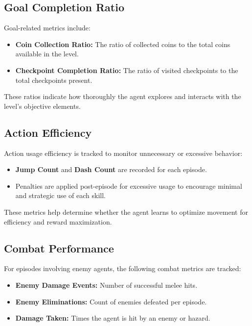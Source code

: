 \documentclass[12pt,oneside,openright,a4paper]{cpe-english-project}
\begin{document}
\subsection{Goal Completion Ratio}
Goal-related metrics include:

\begin{itemize}
\item \textbf{Coin Collection Ratio:} The ratio of collected coins to the total coins available in the level.
\item \textbf{Checkpoint Completion Ratio:} The ratio of visited checkpoints to the total checkpoints present.
\end{itemize}

These ratios indicate how thoroughly the agent explores and interacts with the level’s objective elements.

\subsection{Action Efficiency}
Action usage efficiency is tracked to monitor unnecessary or excessive behavior:

\begin{itemize}
\item \textbf{Jump Count} and \textbf{Dash Count} are recorded for each episode.
\item Penalties are applied post-episode for excessive usage to encourage minimal and strategic use of each skill.
\end{itemize}

These metrics help determine whether the agent learns to optimize movement for efficiency and reward maximization.

\subsection{Combat Performance}

For episodes involving enemy agents, the following combat metrics are tracked:

\begin{itemize}
\item \textbf{Enemy Damage Events:} Number of successful melee hits.
\item \textbf{Enemy Eliminations:} Count of enemies defeated per episode.
\item \textbf{Damage Taken:} Times the agent is hit by an enemy or hazard.
\end{itemize}
\end{document}
